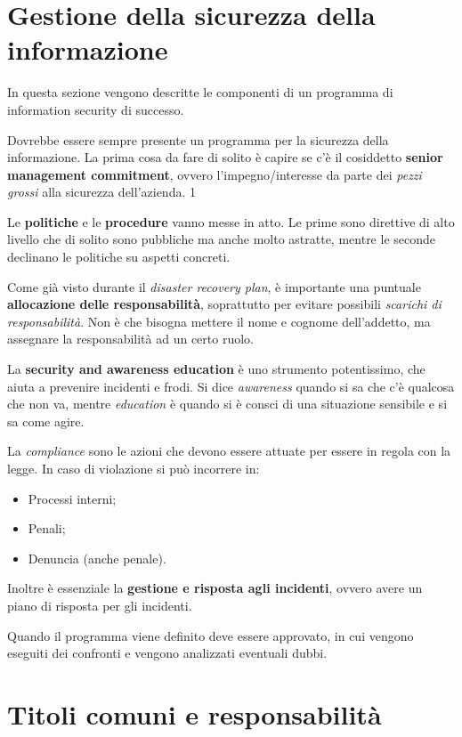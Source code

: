 \section{Gestione della sicurezza della informazione}

In questa sezione vengono descritte le componenti di un programma di 
information security di successo. 

Dovrebbe essere sempre presente un programma per la sicurezza della 
informazione. La prima cosa da fare di solito è capire se c'è il cosiddetto 
\textbf{senior management commitment}, ovvero l'impegno/interesse da parte dei
\emph{pezzi grossi} alla sicurezza dell'azienda. 1

Le \textbf{politiche} e le \textbf{procedure} vanno messe in atto.
Le prime sono direttive di alto livello che di solito sono pubbliche ma anche 
molto astratte, mentre le seconde declinano le politiche su aspetti concreti. 

Come già visto durante il \textit{disaster recovery plan}, è importante una 
puntuale \textbf{allocazione delle responsabilità}, soprattutto per evitare 
possibili \emph{scarichi di responsabilità}. Non è che bisogna mettere il nome 
e cognome dell'addetto, ma assegnare la responsabilità ad un certo ruolo.

La \textbf{security and awareness education} è uno strumento potentissimo, che
aiuta a prevenire incidenti e frodi. Si dice \textit{awareness} quando si sa 
che c'è qualcosa che non va, mentre \textit{education} è quando si è consci di 
una situazione sensibile e si sa come agire.

La \textit{compliance} sono le azioni che devono essere attuate per 
essere in regola con la legge. In caso di violazione si può incorrere in:
\begin{itemize}
  \item Processi interni;
  \item Penali;
  \item Denuncia (anche penale).
\end{itemize}
Inoltre è essenziale la \textbf{gestione e risposta agli incidenti},
ovvero avere un piano di risposta per gli incidenti.

Quando il programma viene definito deve essere approvato, in cui vengono
eseguiti dei confronti e vengono analizzati eventuali dubbi.

\section{Titoli comuni e responsabilità}

